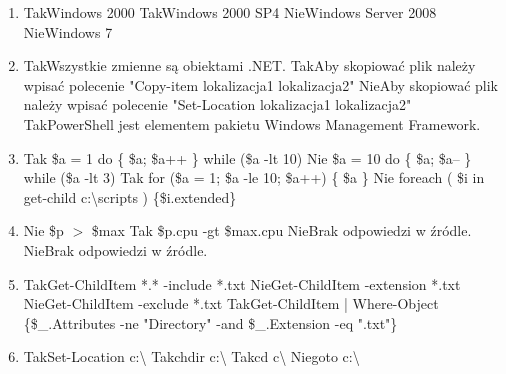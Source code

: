 \begin{enumerate}
		\newpage
		\item {}%
		{Tak}{Windows 2000}%
		{Tak}{Windows 2000 SP4}
		{Nie}{Windows Server 2008}%
		{Nie}{Windows 7}%
		\item {}%
		{Tak}{Wszystkie zmienne są obiektami .NET.}%
		{Tak}{Aby skopiować plik należy wpisać polecenie "Copy-item lokalizacja1 lokalizacja2"}%
		{Nie}{Aby skopiować plik należy wpisać polecenie "Set-Location lokalizacja1 lokalizacja2"}%
		{Tak}{PowerShell jest elementem pakietu Windows Management Framework.}
		\item {}%
		{Tak}{ \$a = 1 do \{ \$a; \$a++ \} while (\$a -lt 10) }%
		{Nie}{ \$a = 10 do \{ \$a; \$a-- \} while (\$a -lt 3) }%
		{Tak}{ for (\$a = 1; \$a -le 10; \$a++) \{ \$a \} }%
		{Nie}{ foreach ( \$i in get-child c:\textbackslash scripts ) \{\$i.extended\} }
		\item {}%
		{Nie}{ \$p $ > $ \$max }%
		{Tak}{ \$p.cpu -gt \$max.cpu }%
		{Nie}{Brak odpowiedzi w źródle.}%
		{Nie}{Brak odpowiedzi w źródle.}
		\item {}%
		{Tak}{Get-ChildItem *.* -include *.txt}%
		{Nie}{Get-ChildItem -extension *.txt}%
		{Nie}{Get-ChildItem -exclude *.txt}%
		{Tak}{Get-ChildItem | Where-Object \{\$\_.Attributes -ne "Directory" -and \$\_.Extension -eq ".txt"\}}
		\item {}%
		{Tak}{Set-Location c:\textbackslash}%
		{Tak}{chdir c:\textbackslash}%
		{Tak}{cd c\textbackslash}%
		{Nie}{goto c:\textbackslash}
		

\end{enumerate}
